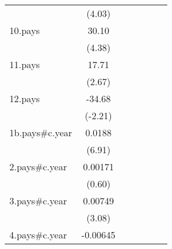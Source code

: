 {\begin{tabular}{l*{6}{c}}
                    &      (4.03)         &                     &                     &                     &                     &                     \\
[1em]
10.pays             &       30.10\sym{***}&                     &                     &                     &                     &                     \\
                    &      (4.38)         &                     &                     &                     &                     &                     \\
[1em]
11.pays             &       17.71\sym{**} &                     &                     &                     &                     &                     \\
                    &      (2.67)         &                     &                     &                     &                     &                     \\
[1em]
12.pays             &      -34.68\sym{*}  &                     &                     &                     &                     &                     \\
                    &     (-2.21)         &                     &                     &                     &                     &                     \\
[1em]
1b.pays#c.year      &      0.0188\sym{***}&                     &                     &                     &                     &                     \\
                    &      (6.91)         &                     &                     &                     &                     &                     \\
[1em]
2.pays#c.year       &     0.00171         &                     &                     &                     &                     &                     \\
                    &      (0.60)         &                     &                     &                     &                     &                     \\
[1em]
3.pays#c.year       &     0.00749\sym{**} &                     &                     &                     &                     &                     \\
                    &      (3.08)         &                     &                     &                     &                     &                     \\
[1em]
4.pays#c.year       &    -0.00645         &                     &                     &                     &                     &                     \\

\end{tabular}}
